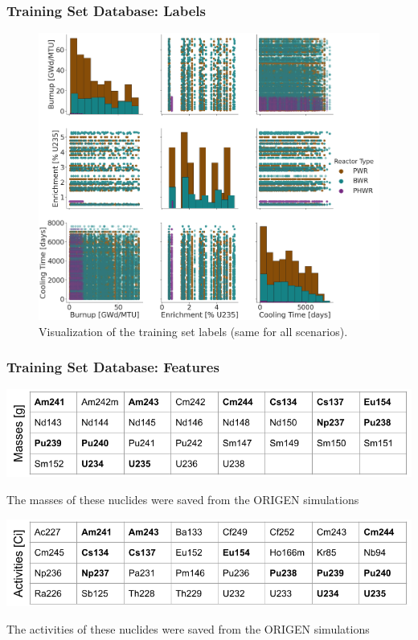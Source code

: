 \begin{frame}
  \frametitle{Training Set Database: Labels}
  \begin{figure}
    \centering
      \includegraphics[height=0.8\textheight]{./figures/histogram_scatter_trainset_viz.png}
      \caption{Visualization of the training set labels (same for all scenarios).}
  \end{figure}
\end{frame}

\begin{frame}
  \frametitle{Training Set Database: Features}
    \begin{table}
      \centering
      \includegraphics[width=\linewidth]{./figures/nuclist_featureset_masses.png}
      \caption{The masses of these nuclides were saved from the ORIGEN simulations}
    \end{table}
    \begin{table}
      \centering
      \includegraphics[width=\linewidth]{./figures/nuclist_featureset_activities.png}
      \caption{The activities of these nuclides were saved from the ORIGEN simulations}
    \end{table}
\end{frame}

